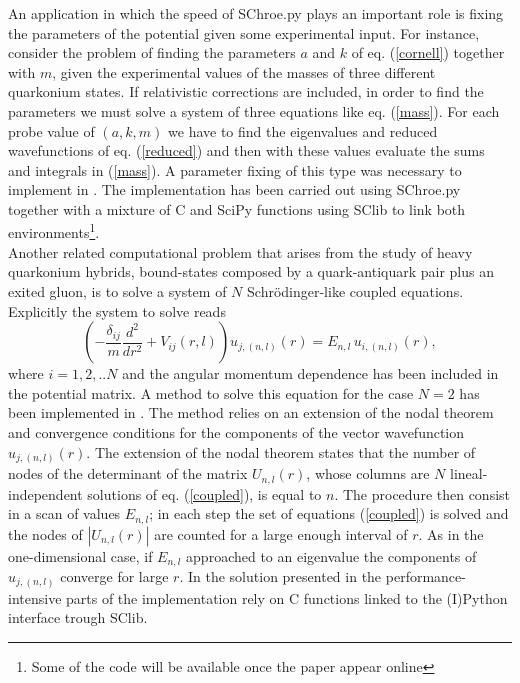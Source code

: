 \documentclass[10pt, a4paper, twocolumn]{article}
\begin{document}
{An application in which the speed of SChroe.py plays an important role is fixing the parameters of the potential given some experimental input. For instance, consider the problem of finding the parameters $a$ and $k$ of eq. (\ref{cornell}) together with $m$, given the experimental values of the masses of three different quarkonium states. If relativistic corrections are included, in order to find the parameters  we must solve a system of three equations like eq. (\ref{mass}). For each probe value of $(a,k,m)$ we have to find the eigenvalues and reduced wavefunctions of eq. (\ref{reduced}) and then with these values evaluate the sums and integrals in (\ref{mass}). A parameter fixing of this type was necessary to implement in \cite{phen-paper}. The implementation has been carried out using SChroe.py together with a mixture of C and SciPy functions using SClib to link both environments\footnote{Some of the code will be available once the paper appear online}.\\ 
Another related computational problem that arises from the study of heavy quarkonium hybrids, bound-states composed by a quark-antiquark pair plus an exited gluon, is to solve a system of $N$ Schr\"odinger-like coupled equations. Explicitly the system to solve reads
\begin{equation}\label{coupled}
    \left(-\frac{\delta_{ij}}{m}\frac{d^2}{dr^2}+V_{ij}(r,l)\right)u_{j,(n,l)}(r)=E_{n,l}\,u_{i,(n,l)}(r),
\end{equation} where $i = 1,2,..N$ and the angular momentum dependence has been included in the potential matrix. A method to solve this equation for the case $N=2$ has been implemented in \cite{coup-paper}. The method relies on an extension of the nodal theorem \cite{nodal} and convergence conditions for the components of the vector wavefunction $u_{j,(n,l)}(r)$. The extension of the nodal theorem states that the number of nodes of the determinant of the matrix $U_{n,l}(r)$, whose columns are $N$ lineal-independent solutions of eq. (\ref{coupled}), is equal to $n$. The procedure then consist in a scan of values $E_{n,l}$; in each step the set of equations (\ref{coupled}) is solved and the nodes of $|U_{n,l}(r)|$ are counted for a large enough interval of $r$. As in the one-dimensional case, if $E_{n,l}$ approached to an eigenvalue the components of $u_{j,(n,l)}$ converge for large $r$. In the solution presented in \cite{coup-paper} the performance-intensive parts of the implementation rely on C functions linked to the (I)Python interface trough SClib.\\
}
\end{document}
